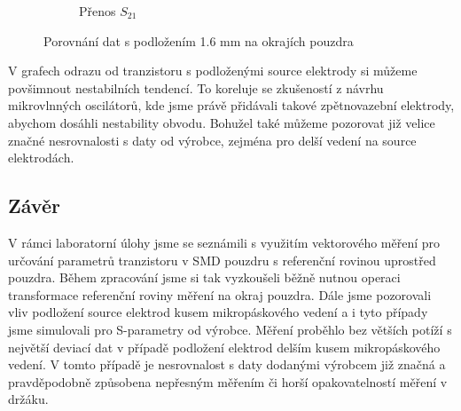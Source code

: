 \documentclass[11pt,a4paper]{article}
\begin{document}
\begin{figure}[!ht]
\begin{subfigure}{0.45\textwidth}
    \caption{Přenos $S_{21}$}
\end{subfigure}
\caption{\label{fig:1m6m}Porovnání dat s podložením 1.6 mm na okrajích pouzdra}
\end{figure}

V grafech odrazu od tranzistoru s podloženými source elektrody si můžeme povšimnout nestabilních tendencí. To koreluje se zkušeností z návrhu mikrovlnných oscilátorů, kde jsme právě přidávali takové zpětnovazební elektrody, abychom dosáhli nestability obvodu. Bohužel také můžeme pozorovat již velice značné nesrovnalosti s daty od výrobce, zejména pro delší vedení na source elektrodách.

\subsection*{Závěr}
V rámci laboratorní úlohy jsme se seznámili s využitím vektorového měření pro určování parametrů tranzistoru v SMD pouzdru s referenční rovinou uprostřed pouzdra. Během zpracování jsme si tak vyzkoušeli běžně nutnou operaci transformace referenční roviny měření na okraj pouzdra. Dále jsme pozorovali vliv podložení source elektrod kusem mikropáskového vedení a i tyto případy jsme simulovali pro S-parametry od výrobce. Měření proběhlo bez větších potíží s největší deviací dat v případě podložení elektrod delším kusem mikropáskového vedení. V tomto případě je nesrovnalost s daty dodanými výrobcem již značná a pravděpodobně způsobena nepřesným měřením či horší opakovatelností měření v držáku.
\end{document}
